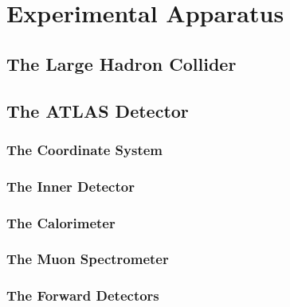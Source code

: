 \documentclass[10pt,twoside,cucitura,classica,english,openany]{toptesi}
\begin{document}


\chapter{Experimental Apparatus}
\label{cha:exper-appar}

\section{The Large Hadron Collider}
\label{sec:large-hadr-coll}



\section{The ATLAS Detector}
\label{sec:atlas-detector}



\subsection{The Coordinate System}
\label{sec:coordinate-system}



\subsection{The Inner Detector}
\label{sec:inner-detector}



\subsection{The Calorimeter}
\label{sec:calorimeters}



\subsection{The Muon Spectrometer}
\label{sec:muon-spectrometer}



\subsection{The Forward Detectors}
\label{sec:forward-detectors}
\end{document}
